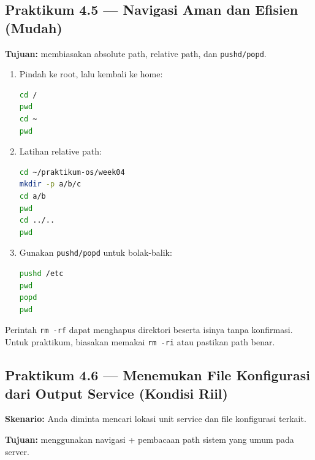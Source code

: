 \subsection*{Praktikum 4.5 --- Navigasi Aman dan Efisien (Mudah)}
\textbf{Tujuan:} membiasakan absolute path, relative path, dan \texttt{pushd/popd}.

\begin{enumerate}
    \item Pindah ke root, lalu kembali ke home:
\begin{lstlisting}[language=bash, caption={Absolute path vs kembali ke home}]
cd /
pwd
cd ~
pwd
\end{lstlisting}

    \item Latihan relative path:
\begin{lstlisting}[language=bash, caption={Relative path di workspace}]
cd ~/praktikum-os/week04
mkdir -p a/b/c
cd a/b
pwd
cd ../..
pwd
\end{lstlisting}

    \item Gunakan \texttt{pushd/popd} untuk bolak-balik:
\begin{lstlisting}[language=bash, caption={Navigasi stack direktori}]
pushd /etc
pwd
popd
pwd
\end{lstlisting}
\end{enumerate}

\begin{warningbox}
Perintah \texttt{rm -rf} dapat menghapus direktori beserta isinya tanpa konfirmasi.
Untuk praktikum, biasakan memakai \texttt{rm -ri} atau pastikan path benar.
\end{warningbox}

\subsection*{Praktikum 4.6 --- Menemukan File Konfigurasi dari Output Service (Kondisi Riil)}
\textbf{Skenario:} Anda diminta mencari lokasi unit service dan file konfigurasi terkait.

\textbf{Tujuan:} menggunakan navigasi + pembacaan path sistem yang umum pada server.

